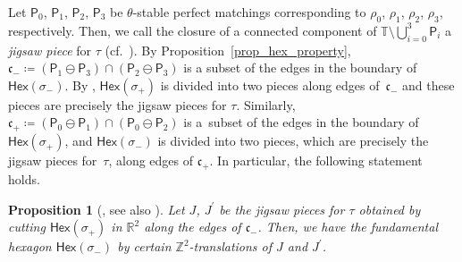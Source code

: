 \documentclass[10pt,a4paper]{amsart}
\numberwithin{equation}{section}
\newtheorem{Proposition}[Theorem]{Proposition}
\theoremstyle{definition}
\newcommand{\ZZ}{\mathbb{Z}}
\newcommand{\RR}{\mathbb{R}}
\newcommand{\TT}{\mathbb{T}}
\newcommand{\fkc}{\mathfrak{c}}
\newcommand{\sfP}{\mathsf{P}}
\newcommand{\Hex}{\mathsf{Hex}}
\begin{document}
Let $\sfP_0$, $\sfP_1$, $\sfP_2$, $\sfP_3$ be $\theta$-stable perfect matchings corresponding to $\rho_0$, $\rho_1$, $\rho_2$, $\rho_3$, respectively.
Then, we call the closure of a connected component of $\TT{\setminus}\bigcup_{i=0}^3\sfP_i$ a \emph{jigsaw piece} for $\tau$ (cf.\ \cite[Definition~3.10]{CHT}).
By Proposition~\ref{prop_hex_property}, $\fkc_-\coloneqq(\sfP_1\ominus\sfP_3)\cap(\sfP_2\ominus\sfP_3)$ is a subset of the edges in the boundary of $\Hex(\sigma_-)$.
By \cite[Lemma~3.11]{CHT}, $\Hex(\sigma_+)$ is divided into two pieces along edges of~$\fkc_-$ and these pieces are precisely the jigsaw pieces for $\tau$.
Similarly, $\fkc_+\coloneqq(\sfP_0\ominus\sfP_1)\cap(\sfP_0\ominus\sfP_2)$ is a~subset of the edges in the boundary of $\Hex(\sigma_+)$,
and $\Hex(\sigma_-)$ is divided into two pieces, which are precisely the jigsaw pieces for~$\tau$, along edges of $\fkc_+$.
In particular, the following statement holds.

\begin{Proposition}[{\cite[Theorem~3.12]{CHT}, see also \cite{Nak_GHilb}}]\label{prop_jigsaw}
Let $J$, $J^\prime$ be the jigsaw pieces for $\tau$ obtained by cutting $\Hex(\sigma_+)$ in $\RR^2$ along the edges of $\fkc_-$. Then, we have the fundamental hexagon $\Hex(\sigma_-)$ by certain $\ZZ^2$-translations of $J$ and $J^\prime$.
\end{Proposition}
\end{document}
